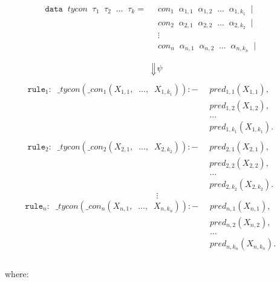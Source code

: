 \documentclass{report}
\theoremstyle{definition}
\theoremstyle{definition}
\newcommand{\ttt}[1]{\texttt{#1}}
\newcommand{\tav}{\;\;}
\newcommand{\SLongdownarrow}{\mathrel{\rotatebox[origin=c]{-90}{$\Longrightarrow$}}}
\begin{document}
\begin{align*}
	\ttt{data} \tav tycon \tav \tau_1 \tav \tau_2 \tav \ldots \tav \tau_k 	= & \tav con_1 \tav \alpha_{1,1} \tav \alpha_{1,2} \tav \ldots \tav \alpha_{1,k_1} \tav | &   &   \\
	                                                                         & \tav con_2 \tav \alpha_{2,1} \tav \alpha_{2,2} \tav \ldots \tav \alpha_{2,k_2} \tav | &   &   \\
	                                                                         & \tav \vdots \tav                                                                      &   &   \\
	                                                                         & \tav con_n \tav \alpha_{n,1} \tav \alpha_{n,2} \tav \ldots \tav \alpha_{n,k_n} \tav | &   &   \\
\end{align*}
$$\SLongdownarrow \psi$$
\begin{align*}
	\ttt{rule}_1: \tav \_ tycon (\_ con_1(X_{1,1}, \tav \ldots, \tav X_{1,k_1})) :-&
	\tav pred_{1, 1}(X_{1,1}), && \\
	  & \tav pred_{1, 2}(X_{1,2}),     &   &   \\
	  & \tav \ldots \tav               &   &   \\
	  & \tav pred_{1, k_1}(X_{1,k_1}). &   &   \\
	\\
	\ttt{rule}_2: \tav \_ tycon (\_ con_2(X_{2,1}, \tav \ldots, \tav X_{2,k_2})) :-&
	\tav pred_{2, 1}(X_{2,1}), && \\
	  & \tav pred_{2, 2}(X_{2,2}),     &   &   \\
	  & \tav \ldots \tav               &   &   \\
	  & \tav pred_{2, k_2}(X_{2,k_2}). &   &   
\end{align*}
$$\vdots$$
\begin{align*}
	\ttt{rule}_n: \tav \_ tycon (\_ con_n(X_{n,1}, \tav \ldots, \tav X_{n,k_n})) :-&
	\tav pred_{n, 1}(X_{n,1}), && \\
	  & \tav pred_{n, 2}(X_{n,2}),     &   &   \\
	  & \tav \ldots \tav               &   &   \\
	  & \tav pred_{n, k_n}(X_{n,k_n}). &   &   \\
\end{align*}\\
where:
\end{document}
